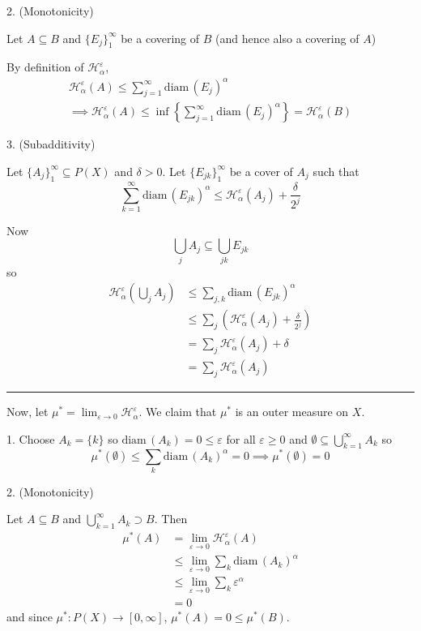\documentclass[12pt]{article}
\newcommand{\ep}{\varepsilon}
\renewcommand{\H}{\mathcal{H}}
\newcommand{\diam}{\text{diam}\,}
\newcommand{\sub}{\subseteq}
\renewcommand{\div}{\vspace*{10pt}\hrule\vspace*{10pt}}
\begin{document}
    2. (Monotonicity)

    Let $A \sub B$ and $\{E_j\}_1^{\infty}$ be a covering of $B$ (and hence also a covering of $A$)

    By definition of $\H_{\alpha}^{\ep}$,
    \begin{gather*}
        \H_{\alpha}^{\ep}(A) \leq \sum_{j=1}^{\infty} \diam(E_j)^\alpha\\ 
        \implies \H_{\alpha}^{\ep}(A) \leq \inf\left\{\sum_{j=1}^{\infty} \diam(E_j)^\alpha\right\} = \H_{\alpha}^{\ep}(B)
    \end{gather*}
    
    3. (Subadditivity)

    Let $\{A_j\}_1^{\infty} \sub P(X)$ and $\delta > 0$. Let $\{E_{jk}\}_1^{\infty}$ be a cover of $A_j$ such that
    \[\sum_{k=1}^{\infty} \diam(E_{jk})^\alpha \leq \H_{\alpha}^{\ep}(A_j) + \frac{\delta}{2^j}\]

    Now 
    \[\bigcup_{j} A_j \sub \bigcup_{jk} E_{jk}\]
    so 
    \begin{align*}
        \H_{\alpha}^{\ep}\left(\bigcup_j A_j\right)&\leq \sum_{j,k} \diam(E_{jk})^{\alpha}\\ 
        &\leq \sum_{j} \left(\H_{\alpha}^{\ep}(A_j) + \frac{\delta}{2^j}\right)\\
        &= \sum_{j} \H_{\alpha}^{\ep}(A_j) + \delta\\
        &= \sum_{j} \H_{\alpha}^{\ep}(A_j)
    \end{align*}

    \div 

    Now, let $\mu^* = \lim_{\ep \to 0} \H_{\alpha}^{\ep}$.  We claim that $\mu^*$ is an outer measure on $X$.

    1. Choose $A_k = \{k\}$ so $\diam(A_k) = 0 \leq \ep$ for all $\ep \geq 0$ and $\emptyset \sub \bigcup_{k=1}^\infty A_k$ so 
    \[\mu^*(\emptyset) \leq \sum_k \diam(A_k)^{\alpha} = 0 \implies \mu^*(\emptyset) = 0\]

    2. (Monotonicity)

    Let $A \sub B$ and $\bigcup_{k=1}^\infty A_k \supset B$. Then
    \begin{align*}
        \mu^*(A) &= \lim_{\ep \to 0} \H_{\alpha}^{\ep}(A)\\
        &\leq \lim_{\ep \to 0} \sum_k \diam(A_k)^{\alpha}\\ 
        &\leq \lim_{\ep \to 0} \sum_k \ep^{\alpha}\\ 
        &= 0 
    \end{align*}
    and since $\mu^*: P(X) \to [0, \infty]$, $\mu^*(A) = 0 \leq \mu^*(B)$.
\end{document}
